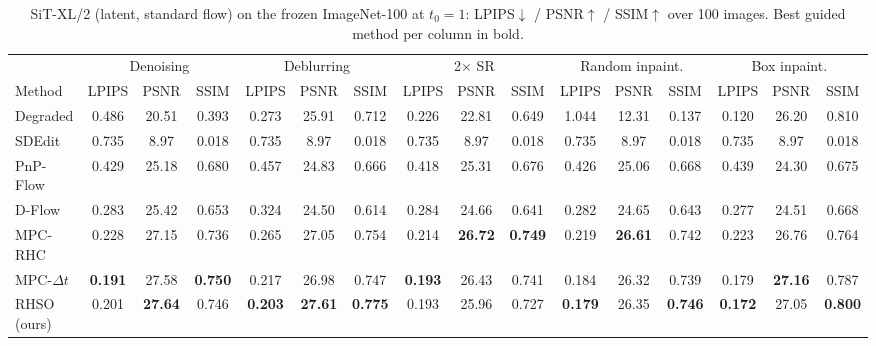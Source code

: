\begin{table}[t]
\centering
\small
\setlength{\tabcolsep}{3.5pt}
\caption{SiT-XL/2 (latent, standard flow) on the frozen ImageNet-100 at $t_0 = 1$: LPIPS$\downarrow$ / PSNR$\uparrow$ / SSIM$\uparrow$ over 100 images. Best guided method per column in bold.}
\label{tab:final_sit}
\begin{tabular}{lccccccccccccccc}
\toprule
 & \multicolumn{3}{c}{Denoising} & \multicolumn{3}{c}{Deblurring} & \multicolumn{3}{c}{2$\times$ SR} & \multicolumn{3}{c}{Random inpaint.} & \multicolumn{3}{c}{Box inpaint.} \\
\cmidrule(lr){2-4} \cmidrule(lr){5-7} \cmidrule(lr){8-10} \cmidrule(lr){11-13} \cmidrule(lr){14-16}
Method & LPIPS & PSNR & SSIM & LPIPS & PSNR & SSIM & LPIPS & PSNR & SSIM & LPIPS & PSNR & SSIM & LPIPS & PSNR & SSIM \\
\midrule
Degraded & 0.486 & 20.51 & 0.393 & 0.273 & 25.91 & 0.712 & 0.226 & 22.81 & 0.649 & 1.044 & 12.31 & 0.137 & 0.120 & 26.20 & 0.810 \\
\midrule
SDEdit & 0.735 & 8.97 & 0.018 & 0.735 & 8.97 & 0.018 & 0.735 & 8.97 & 0.018 & 0.735 & 8.97 & 0.018 & 0.735 & 8.97 & 0.018 \\
PnP-Flow & 0.429 & 25.18 & 0.680 & 0.457 & 24.83 & 0.666 & 0.418 & 25.31 & 0.676 & 0.426 & 25.06 & 0.668 & 0.439 & 24.30 & 0.675 \\
D-Flow & 0.283 & 25.42 & 0.653 & 0.324 & 24.50 & 0.614 & 0.284 & 24.66 & 0.641 & 0.282 & 24.65 & 0.643 & 0.277 & 24.51 & 0.668 \\
MPC-RHC & 0.228 & 27.15 & 0.736 & 0.265 & 27.05 & 0.754 & 0.214 & \textbf{26.72} & \textbf{0.749} & 0.219 & \textbf{26.61} & 0.742 & 0.223 & 26.76 & 0.764 \\
MPC-$\Delta t$ & \textbf{0.191} & 27.58 & \textbf{0.750} & 0.217 & 26.98 & 0.747 & \textbf{0.193} & 26.43 & 0.741 & 0.184 & 26.32 & 0.739 & 0.179 & \textbf{27.16} & 0.787 \\
RHSO (ours) & 0.201 & \textbf{27.64} & 0.746 & \textbf{0.203} & \textbf{27.61} & \textbf{0.775} & 0.193 & 25.96 & 0.727 & \textbf{0.179} & 26.35 & \textbf{0.746} & \textbf{0.172} & 27.05 & \textbf{0.800} \\
\bottomrule
\end{tabular}
\end{table}


